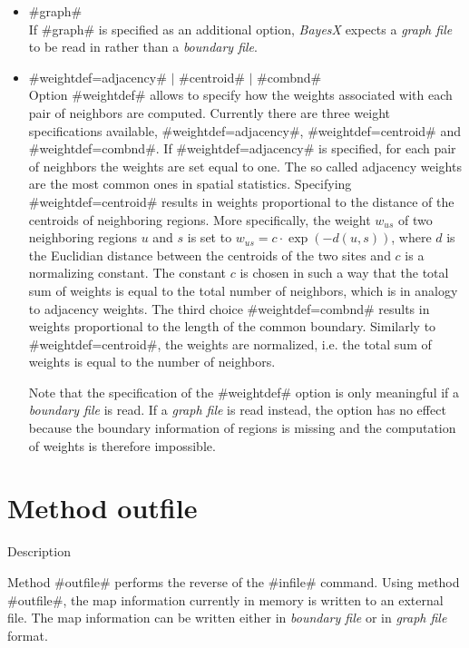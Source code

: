 \begin{itemize}
\item #graph# \\
If #graph# is specified as an additional option, {\em BayesX}
expects a {\em graph file} to be read in rather than a {\em
boundary file}.
\item #weightdef=adjacency# $|$ #centroid#  $|$ #combnd# \\
\label{weightsmap} Option #weightdef# allows to specify how the
weights associated with each pair of neighbors are computed.
Currently there are three weight specifications available,
#weightdef=adjacency#, #weightdef=centroid# and
#weightdef=combnd#. If #weightdef=adjacency# is specified, for
each pair of neighbors the weights are set equal to one. The so
called adjacency weights are the most common ones in spatial
statistics. Specifying #weightdef=centroid# results in weights
proportional to the distance of the centroids of neighboring
regions. More specifically, the weight $w_{us}$ of two neighboring
regions $u$ and $s$ is set to $w_{us} = c \cdot \exp(-d(u,s))$,
where $d$ is the Euclidian distance between the centroids of the
two sites and $c$ is a normalizing constant. The constant $c$ is
chosen in such a way that the total sum of weights is equal to the
total number of neighbors, which is in analogy to adjacency
weights. The third choice #weightdef=combnd# results in weights
proportional to the length of the common boundary. Similarly to
#weightdef=centroid#, the weights are normalized, i.e. the total
sum of weights is equal to the number of neighbors.

Note that the specification of the #weightdef# option is only
meaningful if a {\em boundary file} is read. If a {\em graph file}
is read  instead, the option has no effect because the boundary
information of regions is missing and  the computation of weights
is therefore impossible.
\end{itemize}



\clearpage



\section{Method outfile}
\label{mapoutfile} 

\begin{stanza}{Description}

{Method #outfile# performs the reverse of the #infile# command.
Using method #outfile#, the map information currently in memory is
written to an external file. The map information can be written
either in {\em boundary file} or in {\em graph file} format.}
\end{stanza}

